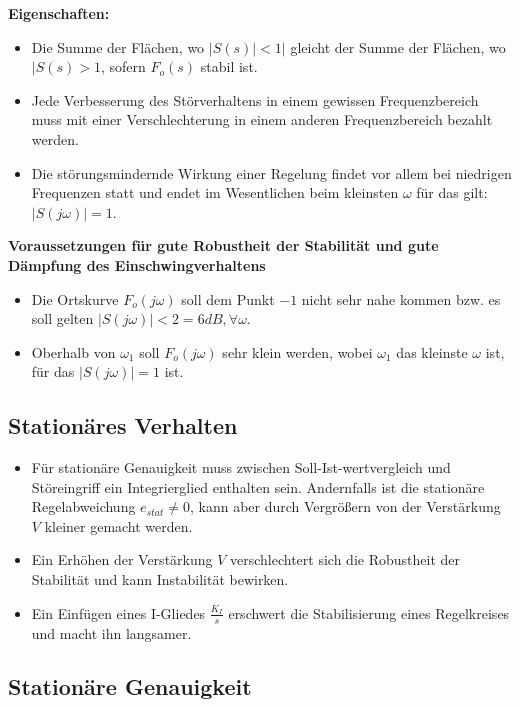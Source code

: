 \documentclass[10pt,a4paper]{article}
\begin{document}
\textbf{Eigenschaften:}
\begin{itemize}
	\item Die Summe der Flächen, wo $|S(s)| < 1|$ gleicht der Summe der Flächen, wo $|S(s) > 1$, sofern $F_o(s)$ stabil ist.
	\item Jede Verbesserung des Störverhaltens in einem gewissen Frequenzbereich muss mit einer Verschlechterung in einem anderen Frequenzbereich bezahlt werden.
	\item Die störungsmindernde Wirkung einer Regelung findet vor allem bei niedrigen Frequenzen statt und endet im Wesentlichen beim kleinsten $\omega$ für das gilt: $|S(j \omega)| = 1$.
\end{itemize}

\textbf{Voraussetzungen für gute Robustheit der Stabilität und gute Dämpfung des Einschwingverhaltens}
\begin{itemize}
	\item Die Ortskurve $F_o(j \omega)$ soll dem Punkt $-1$ nicht sehr nahe kommen bzw. es soll gelten $|S(j \omega)| < 2 = 6dB, \forall \omega$.
	\item Oberhalb von $\omega_1$ soll $F_o(j \omega)$ sehr klein werden, wobei $\omega_1$ das kleinste $\omega$ ist, für das $|S(j \omega)| = 1$ ist.
\end{itemize}

\subsection{Stationäres Verhalten}
\begin{itemize}
	\item Für stationäre Genauigkeit muss zwischen Soll-Ist-wertvergleich und Störeingriff ein Integrierglied enthalten sein. Andernfalls ist die stationäre Regelabweichung $e_{stat} ≠ 0$, kann aber durch Vergrößern von der Verstärkung $V$ kleiner gemacht werden.
	\item Ein Erhöhen der Verstärkung $V$ verschlechtert sich die Robustheit der Stabilität und kann Instabilität bewirken.
	\item Ein Einfügen eines I-Gliedes $\frac{K_I}{s}$ erschwert die Stabilisierung eines Regelkreises und macht ihn langsamer.
\end{itemize}

\subsection{Stationäre Genauigkeit}
\end{document}
